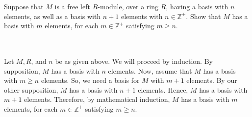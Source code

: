 Suppose that $M$ is a free left $R$-module, over a ring $R$, having a basis with $n$ elements, as well
as a basis with $n+ 1$ elements with $n\in\mathbb{Z}^+$. Show that $M$ has a basis with $m$ elements,
for each $m\in\mathbb{Z}^+$ satisfying $m\geq n$.\\\\

\begin{solution}\renewcommand{\qedsymbol}{}\ \\
    Let $M, R$, and $n$ be as given above. We will proceed by induction. By supposition, $M$ has a basis
    with $n$ elements. Now, assume that $M$ has a basis with $m\geq n$ elements. So, we need a basis for
    $M$ with $m+1$ elements. By our other supposition, $M$ has a basis with $n+1$ elements. Hence, $M$
    has a basis with $m+1$ elements. Therefore, by mathematical induction, $M$ has a basis with $m$
    elements, for each $m\in\mathbb{Z}^+$ satisfying $m\geq n$.

\end{solution}